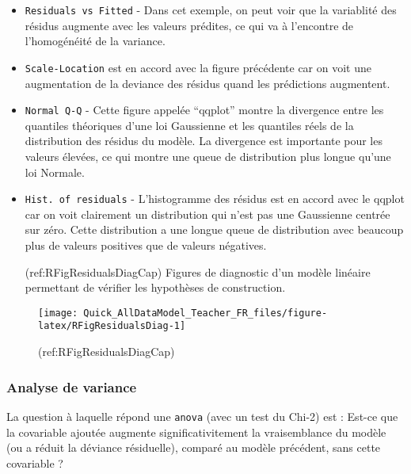\documentclass[french,a4paper]{article}
\begin{document}
\begin{itemize}
\item
  \texttt{Residuals\ vs\ Fitted} - Dans cet exemple, on peut voir que la
  variablité des résidus augmente avec les valeurs prédites, ce qui va à
  l'encontre de l'homogénéité de la variance.
\item
  \texttt{Scale-Location} est en accord avec la figure précédente car on
  voit une augmentation de la deviance des résidus quand les prédictions
  augmentent.
\item
  \texttt{Normal\ Q-Q} - Cette figure appelée ``qqplot'' montre la
  divergence entre les quantiles théoriques d'une loi Gaussienne et les
  quantiles réels de la distribution des résidus du modèle. La
  divergence est importante pour les valeurs élevées, ce qui montre une
  queue de distribution plus longue qu'une loi Normale.
\item
  \texttt{Hist.\ of\ residuals} - L'histogramme des résidus est en
  accord avec le qqplot car on voit clairement un distribution qui n'est
  pas une Gaussienne centrée sur zéro. Cette distribution a une longue
  queue de distribution avec beaucoup plus de valeurs positives que de
  valeurs négatives.

  (ref:RFigResidualsDiagCap) Figures de diagnostic d'un modèle linéaire
  permettant de vérifier les hypothèses de construction.
\end{itemize}

\begin{figure}[!h]

{\centering \texttt{[image: Quick\_AllDataModel\_Teacher\_FR\_files/figure-latex/RFigResidualsDiag-1]} 

}

\caption{(ref:RFigResidualsDiagCap)}\label{fig:RFigResidualsDiag}
\end{figure}

\hypertarget{analyse-de-variance}{%
\subsubsection{Analyse de variance}\label{analyse-de-variance}}

La question à laquelle répond une \texttt{anova} (avec un test du Chi-2)
est : Est-ce que la covariable ajoutée augmente significativitement la
vraisemblance du modèle (ou a réduit la déviance résiduelle), comparé au
modèle précédent, sans cette covariable ?
\end{document}
